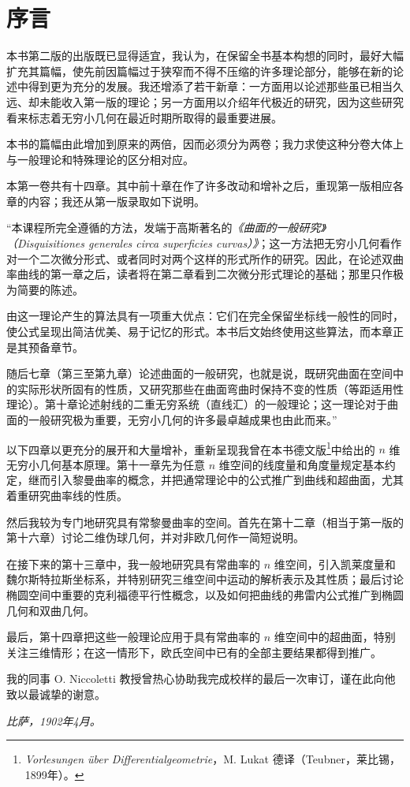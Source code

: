 \section*{序言}
本书第二版的出版既已显得适宜，我认为，在保留全书基本构想的同时，最好大幅扩充其篇幅，使先前因篇幅过于狭窄而不得不压缩的许多理论部分，能够在新的论述中得到更为充分的发展。我还增添了若干新章：一方面用以论述那些虽已相当久远、却未能收入第一版的理论；另一方面用以介绍年代极近的研究，因为这些研究看来标志着无穷小几何在最近时期所取得的最重要进展。

本书的篇幅由此增加到原来的两倍，因而必须分为两卷；我力求使这种分卷大体上与一般理论和特殊理论的区分相对应。

本第一卷共有十四章。其中前十章在作了许多改动和增补之后，重现第一版相应各章的内容；我还从第一版录取如下说明。

\oldquote
“本课程所完全遵循的方法，发端于高斯著名的\emph{《曲面的一般研究》（Disquisitiones generales circa superficies curvas）》}；这一方法把无穷小几何看作对一个二次微分形式、或者同时对两个这样的形式所作的研究。因此，在论述双曲率曲线的第一章之后，读者将在第二章看到二次微分形式理论的基础；那里只作极为简要的陈述。
\closeoldquote

\oldquote
由这一理论产生的算法具有一项重大优点：它们在完全保留坐标线一般性的同时，使公式呈现出简洁优美、易于记忆的形式。本书后文始终使用这些算法，而本章正是其预备章节。

随后七章（第三至第九章）论述曲面的一般研究，也就是说，既研究曲面在空间中的实际形状所固有的性质，又研究那些在曲面弯曲时保持不变的性质（等距适用性理论）。第十章论述射线的二重无穷系统（直线汇）的一般理论；这一理论对于曲面的一般研究极为重要，无穷小几何的许多最卓越成果也由此而来。”
\closeoldquote

以下四章以更充分的展开和大量增补，重新呈现我曾在本书德文版\footnote{\emph{Vorlesungen über Differentialgeometrie}，M. Lukat 德译（Teubner，莱比锡，1899年）。}中给出的 \(n\) 维无穷小几何基本原理。第十一章先为任意 \(n\) 维空间的线度量和角度量规定基本约定，继而引入黎曼曲率的概念，并把通常理论中的公式推广到曲线和超曲面，尤其着重研究曲率线的性质。

然后我较为专门地研究具有常黎曼曲率的空间。首先在第十二章（相当于第一版的第十六章）讨论二维伪球几何，并对非欧几何作一简短说明。

在接下来的第十三章中，我一般地研究具有常曲率的 \(n\) 维空间，引入凯莱度量和魏尔斯特拉斯坐标系，并特别研究三维空间中运动的解析表示及其性质；最后讨论椭圆空间中重要的克利福德平行性概念，以及如何把曲线的弗雷内公式推广到椭圆几何和双曲几何。

最后，第十四章把这些一般理论应用于具有常曲率的 \(n\) 维空间中的超曲面，特别关注三维情形；在这一情形下，欧氏空间中已有的全部主要结果都得到推广。

我的同事 O. Niccoletti 教授曾热心协助我完成校样的最后一次审订，谨在此向他致以最诚挚的谢意。

\begin{flushleft}
\emph{比萨，1902年4月。}
\end{flushleft}

\clearpage
{}

